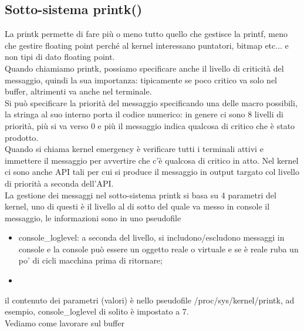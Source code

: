 \documentclass[12pt, oneside]{extbook}
\begin{document}
\subsection{Sotto-sistema printk()}
La printk permette di fare più o meno tutto quello che gestisce la printf, meno che gestire floating point perché al kernel interessano puntatori, bitmap etc... e non tipi di dato floating point.\\Quando chiamiamo printk, possiamo specificare anche il livello di criticità del messaggio, quindi la sua importanza: tipicamente se poco critico va solo nel buffer, altrimenti va anche nel terminale.\\Si può specificare la priorità del messaggio specificando una delle macro possibili, la stringa al suo interno porta il codice numerico: in genere ci sono 8 livelli di priorità, più si va verso 0 e più il messaggio indica qualcosa di critico che è stato prodotto.\\Quando si chiama kernel emergency è verificare tutti i terminali attivi e immettere il messaggio per avvertire che c'è qualcosa di critico in atto. Nel kernel ci sono anche API tali per cui si produce il messaggio in output targato col livello di priorità a seconda dell'API.\\La gestione dei messaggi nel sotto-sistema printk si basa su 4 parametri del kernel, uno di questi è il livello al di sotto del quale va messo in console il messaggio, le informazioni sono in uno pseudofile
\begin{itemize}
\item \textsf{console\_loglevel}: a seconda del livello, si includono/escludono messaggi in console e la console può essere un oggetto reale o virtuale e se è reale ruba un po' di cicli macchina prima di ritornare;
\item 
\end{itemize}
il contenuto dei parametri (valori) è nello pseudofile \textsf{/proc/sys/kernel/printk}, ad esempio, \textsf{console\_loglevel} di solito è impostato a 7.\\Vediamo come lavorare sul buffer
\end{document}
